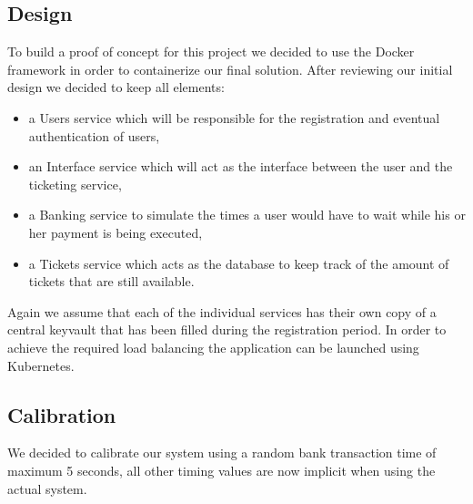 \documentclass[10pt,a4paper,twocolumn]{article}
\begin{document}
\subsection{Design}
To build a proof of concept for this project we decided to use the Docker framework in order to containerize our final solution. After reviewing our initial design we decided to keep all elements:
\begin{itemize}
	\item a Users service which will be responsible for the registration and eventual authentication of users,
	\item an Interface service which will act as the interface between the user and the ticketing service,
	\item a Banking service to simulate the times a user would have to wait while his or her payment is being executed,
	\item a Tickets service which acts as the database to keep track of the amount of tickets that are still available.
\end{itemize}
Again we assume that each of the individual services has their own copy of a central keyvault that has been filled during the registration period. In order to achieve the required load balancing the application can be launched using Kubernetes.\\

\subsection{Calibration}
We decided to calibrate our system using a random bank transaction time of maximum 5 seconds, all other timing values are now implicit when using the actual system.
\end{document}
